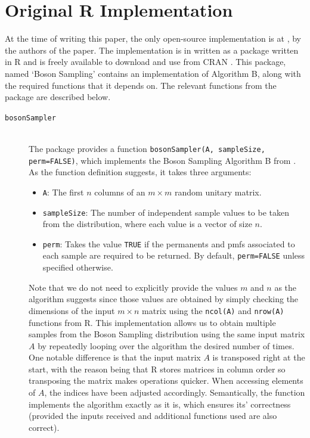 \documentclass[ %
                    author={Manan Vaswani},
                supervisor={Dr. Raphael Clifford},
                    degree={MEng},
                     title={A multi-core CPU implementation of the classical Boson Sampling algorithm},
                  subtitle={},
                      type={},
                      year={2019} ]{dissertation}
\theoremstyle{plain}
\theoremstyle{definition}
\begin{document}
\section{Original R Implementation} \label{sec:r_code}
At the time of writing this paper, the only open-source implementation is at \cite{clifford_r2017}, by the authors of the paper. The implementation is in written as a package written in R and is freely available to download and use from CRAN \cite{cran}. This package, named `Boson Sampling' contains an implementation of Algorithm B, along with the required functions that it depends on. The relevant functions from the package are described below.
\begin{description}
\item[\texttt{bosonSampler}] \hfill \\ The package provides a function \texttt{bosonSampler(A, sampleSize, perm=FALSE)}, which implements the Boson Sampling Algorithm B from \cite{clifford17}. As the function definition suggests, it takes three arguments:
\begin{itemize}
\item \texttt{A}: The first $n$ columns of an $m \times m$ random unitary matrix.
\item \texttt{sampleSize}: The number of independent sample values to be taken from the distribution, where each value is a vector of size $n$.
\item \texttt{perm}: Takes the value \texttt{TRUE} if the permanents and pmfs associated to each sample are required to be returned. By default, \texttt{perm=FALSE} unless specified otherwise.
\end{itemize}
Note that we do not need to explicitly provide the values $m$ and $n$ as the algorithm suggests since those values are obtained by simply checking the dimensions of the input $m \times n$ matrix using the \texttt{ncol(A)} and \texttt{nrow(A)} functions from R. This implementation allows us to obtain multiple samples from the Boson Sampling distribution using the same input matrix $A$ by repeatedly looping over the algorithm the desired number of times. One notable difference is that the input matrix $A$ is transposed right at the start, with the reason being that R stores matrices in column order so transposing the matrix makes operations quicker. When accessing elements of $A$, the indices have been adjusted accordingly. Semantically, the function implements the algorithm exactly as it is, which ensures its' correctness (provided the inputs received and additional functions used are also correct).

\end{description}
\end{document}
